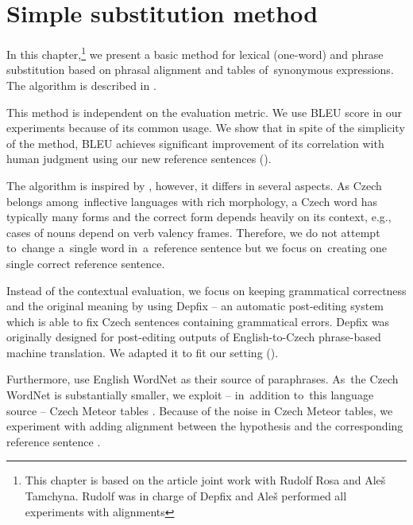 \chapter{Simple substitution method}

In this chapter,\footnote{This chapter is based on the article 
\citep{barancikova:2014} joint work with Rudolf Rosa and Ale\v{s} Tamchyna.
Rudolf was in charge of Depfix and Ale\v{s} performed all experiments with 
alignments} we present a basic method for lexical (one-word) and phrase 
substitution based on phrasal alignment and tables of~synonymous 
expressions. The algorithm is described in .


This method is independent on the evaluation metric. We use BLEU score in our 
experiments because of its common usage.  We show that in spite of the 
simplicity of the method, BLEU achieves significant improvement of its 
correlation with human judgment using our new reference sentences ().

The algorithm is inspired by \cite{kauchak}, however, it differs in several 
aspects. As Czech belongs among~inflective languages with rich morphology, a 
Czech word has typically many forms and the correct form depends heavily on its 
context, e.g., cases of nouns depend on verb valency frames. Therefore, we do 
not attempt to~change a~single word in~a~reference sentence but we focus 
on~creating one single correct reference sentence.

Instead of the contextual evaluation, we focus on keeping grammatical 
correctness and the original meaning by using Depfix \citep{depfix} -- an 
automatic post-editing system which is able to fix Czech sentences containing 
grammatical errors. Depfix was originally designed for post-editing outputs of 
English-to-Czech phrase-based machine translation. We adapted it to fit our 
setting ().

Furthermore, \cite{kauchak} use English WordNet as their source of paraphrases.
As~the Czech WordNet \citep{czech-wordnet} is substantially smaller, we exploit --  
in~addition to~this language source --  Czech Meteor tables \citep{meteor-tables}. Because
of the noise in Czech Meteor tables, we experiment with adding alignment between 
the hypothesis and the corresponding reference sentence .


